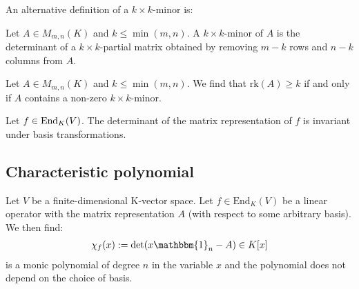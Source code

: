         An alternative definition of a $k\times k$-minor is: 
        \begin{adefinition}[Minor]
		Let $A\in M_{m,n}(K)$ and $k\leq\min(m, n)$. A $k\times k$-minor of $A$ is the determinant of a $k\times k$-partial matrix obtained by removing $m-k$ rows and $n-k$ columns from $A$.
	\end{adefinition}
        \begin{property}
		Let $A\in M_{m,n}(K)$ and $k\leq\min(m, n)$. We find that $\text{rk}(A)\geq k$ if and only if $A$ contains a non-zero $k\times k$-minor.
	\end{property}
        
        \begin{property}
		Let $f\in\textup{End}_K(V)$. The determinant of the matrix representation of $f$ is invariant under basis transformations.
	\end{property}

\subsection{Characteristic polynomial}

    	\begin{definition}\label{linalgebra:characteristic_polynomial}
		Let $V$ be a finite-dimensional K-vector space. Let $f\in \text{End}_K(V)$ be a linear operator with the matrix representation $A$ (with respect to some arbitrary basis). We then find:
		\begin{gather}
                	\chi_f(x) := \det(x\mathbbm{1}_n - A) \in K[x]
		\end{gather}
		is a monic polynomial of degree $n$ in the variable $x$ and the polynomial does not depend on the choice of basis.
	\end{definition}
        
